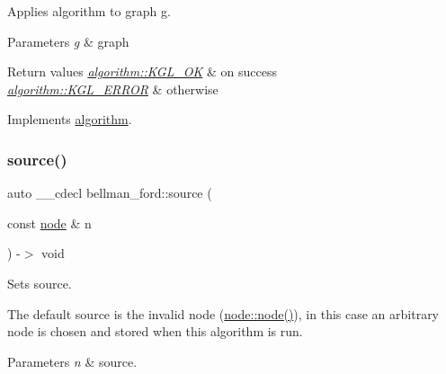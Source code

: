 Applies algorithm to graph g. 


\begin{DoxyParams}{Parameters}
{\em g} & graph \\
\hline
\end{DoxyParams}

\begin{DoxyRetVals}{Return values}
{\em \mbox{\hyperlink{classalgorithm_af1a0078e153aa99c24f9bdf0d97f6710aae4c1cd7fe8d8cf4b143241a6e7c31cf}{algorithm\+::\+K\+G\+L\+\_\+\+OK}}} & on success \\
\hline
{\em \mbox{\hyperlink{classalgorithm_af1a0078e153aa99c24f9bdf0d97f6710ae67bf27b2ef31f73e545a7f9f4a69556}{algorithm\+::\+K\+G\+L\+\_\+\+E\+R\+R\+OR}}} & otherwise \\
\hline
\end{DoxyRetVals}


Implements \mbox{\hyperlink{classalgorithm_a482eb28cacba018b5a86d3a819a50a2f}{algorithm}}.

\mbox{\label{classbellman__ford_a6b371e1520ff9f9c19f6eba10c2b55cd}} 
\subsubsection{\texorpdfstring{source()}{source()}\hspace{0.1cm}{\footnotesize\ttfamily [1/2]}}
{\footnotesize\ttfamily auto \+\_\+\+\_\+cdecl bellman\+\_\+ford\+::source (\begin{DoxyParamCaption}\item[{const \mbox{\hyperlink{classnode}{node}} \&}]{n }\end{DoxyParamCaption}) -\/$>$ void \hspace{0.3cm}{\ttfamily [inline]}}



Sets source. 

The default source is the invalid node (\mbox{\hyperlink{classnode_ad603259398d5667e3b97a6322a2bcc20}{node\+::node()}}), in this case an arbitrary node is chosen and stored when this algorithm is run.


\begin{DoxyParams}{Parameters}
{\em n} & source. \\
\hline
\end{DoxyParams}
\mbox{\label{classbellman__ford_a3645ee2843ff63ef2538047a8f49d1f0}} 
